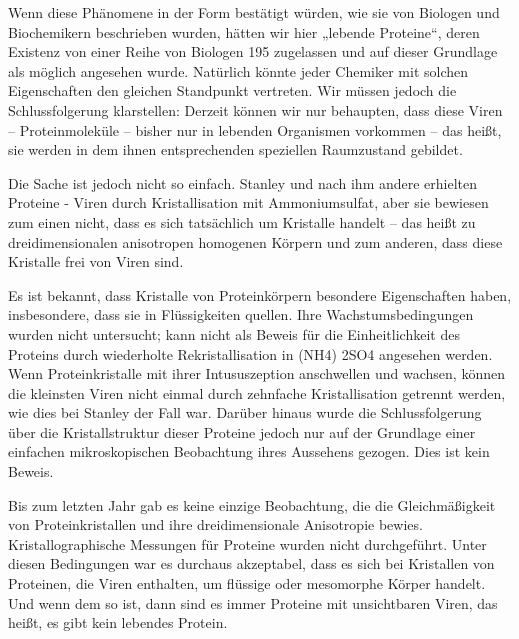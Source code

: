 \documentclass[11pt,a4paper]{book}
\begin{document}
Wenn diese Phänomene in der Form bestätigt würden, wie sie von Biologen und Biochemikern beschrieben wurden, hätten wir hier „lebende Proteine“, deren Existenz von einer Reihe von Biologen 195 zugelassen und auf dieser Grundlage als möglich angesehen wurde. Natürlich könnte jeder Chemiker mit solchen Eigenschaften den gleichen Standpunkt vertreten. Wir müssen jedoch die Schlussfolgerung klarstellen: Derzeit können wir nur behaupten, dass diese Viren -- Proteinmoleküle -- bisher nur in lebenden Organismen vorkommen -- das heißt, sie werden in dem ihnen entsprechenden speziellen Raumzustand gebildet.



Die Sache ist jedoch nicht so einfach. Stanley und nach ihm andere erhielten Proteine - Viren durch Kristallisation mit Ammoniumsulfat, aber sie bewiesen zum einen nicht, dass es sich tatsächlich um Kristalle handelt -- das heißt zu dreidimensionalen anisotropen homogenen Körpern und zum anderen, dass diese Kristalle frei von Viren sind.



Es ist bekannt, dass Kristalle von Proteinkörpern besondere Eigenschaften haben, insbesondere, dass sie in Flüssigkeiten quellen. Ihre Wachstumsbedingungen wurden nicht untersucht; kann nicht als Beweis für die Einheitlichkeit des Proteins durch wiederholte Rekristallisation in (NH4) 2SO4 angesehen werden. Wenn Proteinkristalle mit ihrer Intususzeption anschwellen und wachsen, können die kleinsten Viren nicht einmal durch zehnfache Kristallisation getrennt werden, wie dies bei Stanley der Fall war. Darüber hinaus wurde die Schlussfolgerung über die Kristallstruktur dieser Proteine jedoch nur auf der Grundlage einer einfachen mikroskopischen Beobachtung ihres Aussehens gezogen. Dies ist kein Beweis.



Bis zum letzten Jahr gab es keine einzige Beobachtung, die die Gleichmäßigkeit von Proteinkristallen und ihre dreidimensionale Anisotropie bewies. Kristallographische Messungen für Proteine wurden nicht durchgeführt. Unter diesen Bedingungen war es durchaus akzeptabel, dass es sich bei Kristallen von Proteinen, die Viren enthalten, um flüssige oder mesomorphe Körper handelt. Und wenn dem so ist, dann sind es immer Proteine mit unsichtbaren Viren, das heißt, es gibt kein lebendes Protein.
\end{document}
